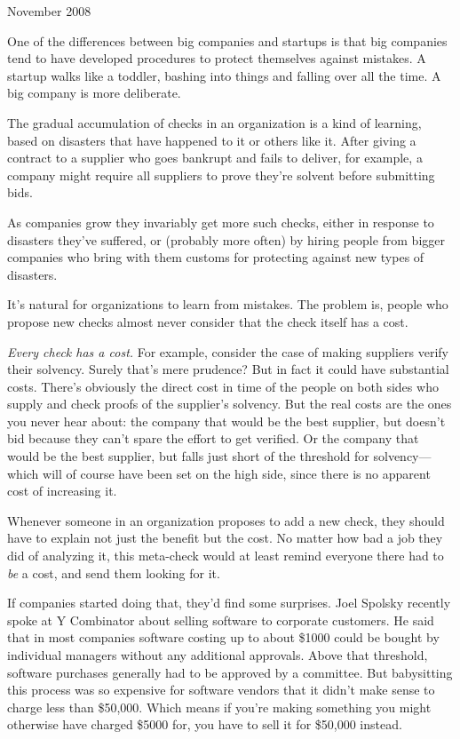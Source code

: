 November 2008

One of the differences between big companies and startups is that big
companies tend to have developed procedures to protect themselves
against mistakes. A startup walks like a toddler, bashing into things
and falling over all the time. A big company is more deliberate.

The gradual accumulation of checks in an organization is a kind of
learning, based on disasters that have happened to it or others like it.
After giving a contract to a supplier who goes bankrupt and fails to
deliver, for example, a company might require all suppliers to prove
they're solvent before submitting bids.

As companies grow they invariably get more such checks, either in
response to disasters they've suffered, or (probably more often) by
hiring people from bigger companies who bring with them customs for
protecting against new types of disasters.

It's natural for organizations to learn from mistakes. The problem is,
people who propose new checks almost never consider that the check
itself has a cost.

\emph{Every check has a cost.} For example, consider the case of making
suppliers verify their solvency. Surely that's mere prudence? But in
fact it could have substantial costs. There's obviously the direct cost
in time of the people on both sides who supply and check proofs of the
supplier's solvency. But the real costs are the ones you never hear
about: the company that would be the best supplier, but doesn't bid
because they can't spare the effort to get verified. Or the company that
would be the best supplier, but falls just short of the threshold for
solvency---which will of course have been set on the high side, since
there is no apparent cost of increasing it.

Whenever someone in an organization proposes to add a new check, they
should have to explain not just the benefit but the cost. No matter how
bad a job they did of analyzing it, this meta-check would at least
remind everyone there had to \emph{be} a cost, and send them looking for
it.

If companies started doing that, they'd find some surprises. Joel
Spolsky recently spoke at Y Combinator about selling software to
corporate customers. He said that in most companies software costing up
to about \$1000 could be bought by individual managers without any
additional approvals. Above that threshold, software purchases generally
had to be approved by a committee. But babysitting this process was so
expensive for software vendors that it didn't make sense to charge less
than \$50,000. Which means if you're making something you might
otherwise have charged \$5000 for, you have to sell it for \$50,000
instead.

